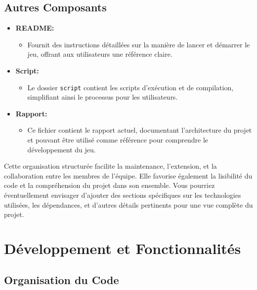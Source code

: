 \documentclass{article}
\begin{document}
\subsection*{Autres Composants}

\begin{itemize}
    \item \textbf{README:}
    \begin{itemize}
        \item Fournit des instructions détaillées sur la manière de lancer et démarrer le jeu, offrant aux utilisateurs une référence claire.
    \end{itemize}

    \item \textbf{Script:}
    \begin{itemize}
        \item Le dossier \texttt{script} contient les scripts d'exécution et de compilation, simplifiant ainsi le processus pour les utilisateurs.
    \end{itemize}

    \item \textbf{Rapport:}
    \begin{itemize}
        \item Ce fichier contient le rapport actuel, documentant l'architecture du projet et pouvant être utilisé comme référence pour comprendre le développement du jeu. \\
    \end{itemize}
\end{itemize}

Cette organisation structurée facilite la maintenance, l'extension, et la collaboration entre les membres de l'équipe. Elle favorise également la lisibilité du code et la compréhension du projet dans son ensemble. Vous pourriez éventuellement envisager d'ajouter des sections spécifiques sur les technologies utilisées, les dépendances, et d'autres détails pertinents pour une vue complète du projet.



\section{Développement et Fonctionnalités}

\subsection{Organisation du Code}
\end{document}
